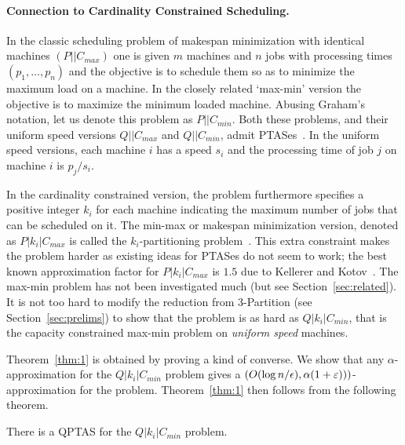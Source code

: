 \paragraph{Connection to Cardinality Constrained Scheduling.}
In the classic scheduling problem of makespan minimization with identical machines $(P||C_{max})$ one is given $m$ machines and $n$ jobs with processing times $(p_1,\ldots,p_n)$	and the objective is to schedule them so as to minimize the maximum load on a machine.
In the closely related `max-min' version the objective is to maximize the minimum loaded machine. Abusing Graham's notation, let us denote this problem as $P||C_{min}$.
Both these problems, and their uniform speed versions $Q||C_{max}$ and $Q||C_{min}$, admit PTASes~\cite{bibid}. In the uniform speed versions, each machine $i$  has a speed $s_i$ and the processing time of job $j$ on machine $i$ is $p_j/s_i$.

In the cardinality constrained version, the problem furthermore specifies a positive integer $k_i$ for each machine indicating the maximum number of jobs that can be scheduled on it. The min-max or makespan minimization version, denoted as $P|k_i|C_{max}$ is called the $k_i$-partitioning problem~\cite{bibid}.  This extra constraint makes the problem harder as existing ideas for PTASes do not seem to work; the best known approximation factor for $P|k_i|C_{max}$ is $1.5$ due to Kellerer and Kotov~\cite{KK11}.
The max-min problem has not been investigated much (but see Section~\ref{sec:related}).
It is not too hard to modify the reduction from $3$-Partition (see Section~\ref{sec:prelims}) to show that the \mckc problem is as hard as $Q|k_i|C_{min}$, that is the capacity constrained max-min problem on {\em uniform speed} machines.

Theorem~\ref{thm:1} is obtained by proving a kind of converse. We show that any $\alpha$-approximation for the $Q|k_i|C_{min}$ problem gives a $\left(O(\log n/\epsilon), \alpha(1+\varepsilon))\right)$-approximation for the \mckc problem.
Theorem~\ref{thm:1} then follows from the following theorem.
%
\begin{theorem}\label{thm:q}
	There is a QPTAS for the $Q|k_i|C_{min}$ problem.
\end{theorem}



